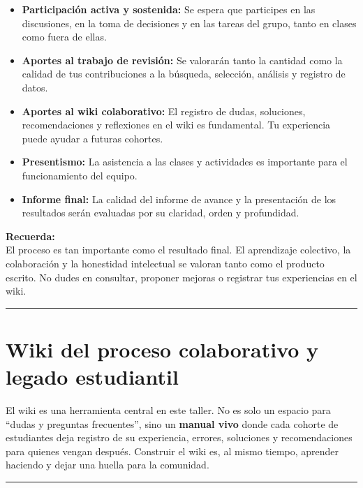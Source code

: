 \documentclass[
  letterpaper,
]{book}
\providecommand{\tightlist}{%
  \setlength{\itemsep}{0pt}\setlength{\parskip}{0pt}}\usepackage{longtable,booktabs,array}
\begin{document}
\begin{itemize}
\tightlist
\item
  \textbf{Participación activa y sostenida:} Se espera que participes en
  las discusiones, en la toma de decisiones y en las tareas del grupo,
  tanto en clases como fuera de ellas.
\item
  \textbf{Aportes al trabajo de revisión:} Se valorarán tanto la
  cantidad como la calidad de tus contribuciones a la búsqueda,
  selección, análisis y registro de datos.
\item
  \textbf{Aportes al wiki colaborativo:} El registro de dudas,
  soluciones, recomendaciones y reflexiones en el wiki es fundamental.
  Tu experiencia puede ayudar a futuras cohortes.
\item
  \textbf{Presentismo:} La asistencia a las clases y actividades es
  importante para el funcionamiento del equipo.
\item
  \textbf{Informe final:} La calidad del informe de avance y la
  presentación de los resultados serán evaluadas por su claridad, orden
  y profundidad.
\end{itemize}

\textbf{Recuerda:}\\
El proceso es tan importante como el resultado final. El aprendizaje
colectivo, la colaboración y la honestidad intelectual se valoran tanto
como el producto escrito. No dudes en consultar, proponer mejoras o
registrar tus experiencias en el wiki.

\begin{center}\rule{0.5\linewidth}{0.5pt}\end{center}


\chapter{Wiki del proceso colaborativo y legado
estudiantil}\label{wiki-del-proceso-colaborativo-y-legado-estudiantil}

El wiki es una herramienta central en este taller. No es solo un espacio
para ``dudas y preguntas frecuentes'', sino un \textbf{manual vivo}
donde cada cohorte de estudiantes deja registro de su experiencia,
errores, soluciones y recomendaciones para quienes vengan después.
Construir el wiki es, al mismo tiempo, aprender haciendo y dejar una
huella para la comunidad.

\begin{center}\rule{0.5\linewidth}{0.5pt}\end{center}
\end{document}
